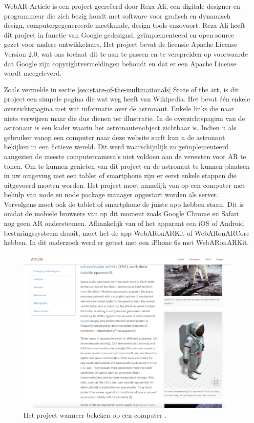 WebAR-Article is een project gecreëerd door Reza Ali, een digitale designer en programmeur die zich bezig houdt met software voor grafisch en dynamisch design, computergegenereerde meetkunde, design tools enzovoort. Reza Ali heeft dit project in functie van Google gedesignd, geïmplementeerd en open source gezet voor andere ontwikkelaars. Het project bevat de licensie Apache License Version 2.0, wat ons toelaat dit te aan te passen en te verspreiden op voorwaarde dat Google zijn copyrightvermeldingen behoudt en dat er een Apache License wordt meegeleverd. 

Zoals vermelde in sectie \ref{sec:state-of-the-multinationals} State of the art, is dit project een simpele pagina die wat weg heeft van Wikipedia. Het bevat één enkele overzichtspagina met wat informatie over de astronaut. Enkele links die naar niets verwijzen maar die dus dienen ter illustratie. In de overzichtspagina van de astronaut is een kader waarin het astronautenobject zichtbaar is. Indien u als gebruiker vanop een computer naar deze website surft kun u de astronaut bekijken in een fictieve wereld. Dit werd waarschijnlijk zo geïmplementeerd aangezien de meeste computercamera's niet voldoen aan de vereisten voor AR te tonen. Om te kunnen genieten van dit project en de astronaut te kunnen plaatsen in uw omgeving met een tablet of smartphone zijn er eerst enkele stappen die uitgevoerd moeten worden. Het project moet namelijk van op een computer met behulp van node en node package manager opgestart worden als server. Vervolgens moet ook de tablet of smartphone de juiste app hebben staan. Dit is omdat de mobiele browsers van op dit moment zoals Google Chrome en Safari nog geen AR ondersteunen. Afhankelijk van of het apparaat een iOS of Android besturingssysteem draait, moet het de app WebARonARKit of WebARonARCore hebben. In dit onderzoek werd er getest met een iPhone 6s met WebARonARKit.

\begin{figure}
	\includegraphics[width=\linewidth]{img/WebARArticle.png}
	\caption{Het project wanneer bekeken op een computer \autocite{Ali2018}.}
\end{figure}

